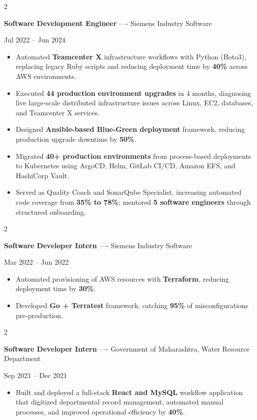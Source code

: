 \documentclass[10pt, letterpaper]{article}
\newenvironment{highlights}{
    \begin{itemize}[
        topsep=0.10 cm,
        parsep=0.06 cm,
        partopsep=0pt,
        itemsep=0.06 cm,
        leftmargin=12pt
    ]
}{
    \end{itemize}
}
\newenvironment{twocolentry}[2][]{
    \onecolentry
    \def\secondColumn{#2}
    \setcolumnwidth{\fill, 4.5 cm}
    \begin{paracol}{2}
}{
    \switchcolumn \raggedleft \secondColumn
    \end{paracol}
    \endonecolentry
}
\begin{document}
\vspace{0.15 cm}

\begin{twocolentry}{Jul 2022 -- Jun 2024}
\textbf{Software Development Engineer} ---- Siemens Industry Software
\end{twocolentry}
\begin{highlights}
  \item Automated \textbf{Teamcenter X} infrastructure workflows with Python (Boto3), replacing legacy Ruby scripts and reducing deployment time by \textbf{40\%} across AWS environments.
  \item Executed \textbf{44 production environment upgrades} in 4 months, diagnosing live large-scale distributed infrastructure issues across Linux, EC2, databases, and Teamcenter X services.
  \item Designed \textbf{Ansible-based Blue-Green deployment} framework, reducing production upgrade downtime by \textbf{50\%}.
  \item Migrated \textbf{40+ production environments} from process-based deployments to Kubernetes using ArgoCD, Helm, GitLab CI/CD, Amazon EFS, and HashiCorp Vault.
  \item Served as Quality Coach and SonarQube Specialist, increasing automated code coverage from \textbf{35\% to 78\%}; mentored \textbf{5 software engineers} through structured onboarding.
\end{highlights}

\vspace{0.15 cm}

\begin{twocolentry}{Mar 2022 -- Jun 2022}
\textbf{Software Developer Intern} ---- Siemens Industry Software
\end{twocolentry}
\begin{highlights}
  \item Automated provisioning of AWS resources with \textbf{Terraform}, reducing deployment time by \textbf{30\%}.
  \item Developed \textbf{Go + Terratest} framework, catching \textbf{95\%} of misconfigurations pre-production.
\end{highlights}

\vspace{0.15 cm}

\begin{twocolentry}{Sep 2021 -- Dec 2021}
\textbf{Software Developer Intern} ---- Government of Maharashtra, Water Resource Department
\end{twocolentry}
\begin{highlights}
  \item Built and deployed a full-stack \textbf{React and MySQL} workflow application that digitized departmental record management, automated manual processes, and improved operational efficiency by \textbf{40\%}.
\end{highlights}
\end{document}
